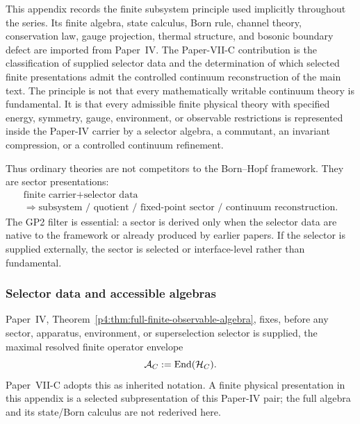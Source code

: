 \documentclass[12pt,a4paper]{article}
\begin{document}
This appendix records the finite subsystem principle used implicitly throughout the series.  Its finite algebra, state calculus, Born rule, channel theory, conservation law, gauge projection, thermal structure, and bosonic boundary defect are imported from Paper~IV.  The Paper-VII-C contribution is the classification of supplied selector data and the determination of which selected finite presentations admit the controlled continuum reconstruction of the main text.  The principle is not that every mathematically writable continuum theory is fundamental.  It is that every admissible finite physical theory with specified energy, symmetry, gauge, environment, or observable restrictions is represented inside the Paper-IV carrier by a selector algebra, a commutant, an invariant compression, or a controlled continuum refinement.

Thus ordinary theories are not competitors to the Born--Hopf framework.  They are sector presentations:
\[
\begin{gathered}
\text{finite carrier}+\text{selector data}
\\
\Longrightarrow
\text{subsystem / quotient / fixed-point sector / continuum reconstruction}.
\end{gathered}
\]
The GP2 filter is essential: a sector is derived only when the selector data are native to the framework or already produced by earlier papers.  If the selector is supplied externally, the sector is selected or interface-level rather than fundamental.


\subsubsection{Selector data and accessible algebras}

\begin{definition}
\label{p12:def:finite-bh-carrier-algebra}
Paper~IV, Theorem~\ref{p4:thm:full-finite-observable-algebra}, fixes, before any sector, apparatus, environment, or superselection
selector is supplied, the maximal resolved finite operator envelope
\begin{equation}
\label{p12:eq:maximal-carrier-algebra}
\mathcal A_C:=\operatorname{End}(\mathcal H_C).
\end{equation}
Paper~VII-C adopts this as inherited notation.  A finite physical presentation in
this appendix is a selected subpresentation of this Paper-IV pair; the full
algebra and its state/Born calculus are not rederived here.
\end{definition}
\end{document}
